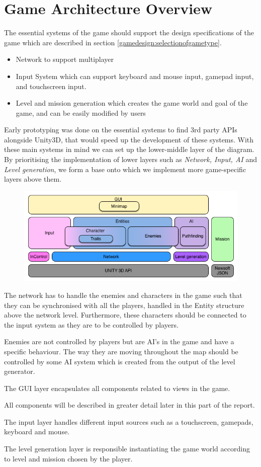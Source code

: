 \section{Game Architecture Overview}
The essential systems of the game should support the design specifications of the game which are described in section \ref{gamedesign:selectionofgametype}.
\begin{itemize}
    \item Network to support multiplayer
    \item Input System which can support keyboard and mouse input, gamepad input, and touchscreen input.
    \item Level and mission generation which creates the game world and goal of the game, and can be easily modified by users
\end{itemize}
Early prototyping was done on the essential systems to find 3rd party APIs alongside Unity3D, that would speed up the development of these systems.
With these main systems in mind we can set up the lower-middle layer of the diagram.
By prioritising the implementation of lower layers such as \textit{Network, Input, AI} and \textit{Level generation}, we form a base onto which we implement more game-specific layers above them.

\begin{figure}
\includegraphics[width = \textwidth]{figures/architecture/game_architecture_overview.png}
\end{figure}

The network has to handle the enemies and characters in the game such that they can be synchronised with all the players, handled in the Entity structure above the network level.
Furthermore, these characters should be connected to the input system as they are to be controlled by players.

Enemies are not controlled by players but are AI's in the game and have a specific behaviour.
The way they are moving throughout the map should be controlled by some AI system which is created from the output of the level generator.

The GUI layer encapsulates all components related to views in the game.

All components will be described in greater detail later in this part of the report.

The input layer handles different input sources such as a touchscreen, gamepads, keyboard and mouse.

The level generation layer is responsible instantiating the game world according to level and mission chosen by the player.
